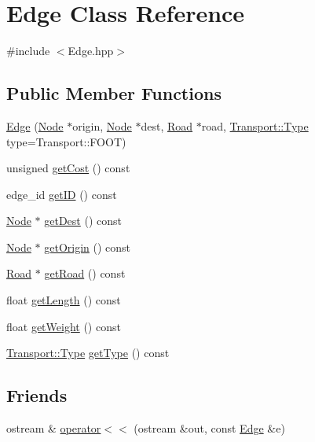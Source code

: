 \hypertarget{class_edge}{}\section{Edge Class Reference}
\label{class_edge}


{\ttfamily \#include $<$Edge.\+hpp$>$}

\subsection*{Public Member Functions}
\begin{DoxyCompactItemize}
\item 
\hyperlink{class_edge_ae9995324a7970fb53ff489a518cac211}{Edge} (\hyperlink{class_node}{Node} $\ast$origin, \hyperlink{class_node}{Node} $\ast$dest, \hyperlink{class_road}{Road} $\ast$road, \hyperlink{class_transport_a1879cecfed0d4238e5a7af6d085db317}{Transport\+::\+Type} type=Transport\+::\+F\+O\+OT)
\item 
unsigned \hyperlink{class_edge_ac047f6b04f3cb9b590058a2a96e303e7}{get\+Cost} () const
\item 
edge\+\_\+id \hyperlink{class_edge_afb88989f2a1b21bdd1d5aaa4054486c3}{get\+ID} () const
\item 
\hyperlink{class_node}{Node} $\ast$ \hyperlink{class_edge_af2cd0f7cba34228f76c4b20a84a2de9d}{get\+Dest} () const
\item 
\hyperlink{class_node}{Node} $\ast$ \hyperlink{class_edge_a04719c702ae24dcfbce3874a573ca360}{get\+Origin} () const
\item 
\hyperlink{class_road}{Road} $\ast$ \hyperlink{class_edge_ae967ccaa1db4dba903ccfb3c55be9bc5}{get\+Road} () const
\item 
float \hyperlink{class_edge_ae96241bc7956c47dba61f7a0cfec01c3}{get\+Length} () const
\item 
float \hyperlink{class_edge_a873322923fa6340e17edb39b923f7d61}{get\+Weight} () const
\item 
\hyperlink{class_transport_a1879cecfed0d4238e5a7af6d085db317}{Transport\+::\+Type} \hyperlink{class_edge_ad36b220701f80c199f9b2ed7bb79a22f}{get\+Type} () const
\end{DoxyCompactItemize}
\subsection*{Friends}
\begin{DoxyCompactItemize}
\item 
ostream \& \hyperlink{class_edge_a4ba287cbdc78be9ec49dd1b67291039b}{operator$<$$<$} (ostream \&out, const \hyperlink{class_edge}{Edge} \&e)
\end{DoxyCompactItemize}


